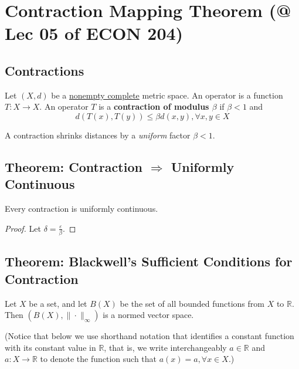 \documentclass[11pt]{elegantbook}
\begin{document}
\section{Contraction Mapping Theorem \small{(@ Lec 05 of ECON 204)}}
\subsection{Contractions}
\begin{definition}
    \normalfont
    Let $(X, d)$ be a \underline{nonempty complete} metric space. An operator is a function $T : X \rightarrow X$. An operator $T$ is a \textbf{contraction of modulus $\beta$} if $\beta < 1$ and $$d(T(x), T(y)) \leq \beta d(x, y), \forall x,y\in X$$
\end{definition}
A contraction shrinks distances by a \textit{uniform} factor $\beta < 1$.

\subsection{Theorem: Contraction $\Rightarrow$ Uniformly Continuous}
\begin{theorem}
    Every contraction is uniformly continuous.
\end{theorem}
\begin{proof}
    Let $\delta=\frac{\varepsilon}{\beta}$.
\end{proof}

\subsection{Theorem: Blackwell's Sufficient Conditions for Contraction}
Let $X$ be a set, and let $B(X)$ be the set of all bounded functions from $X$ to $\mathbb{R}$. Then $(B(X), \|\cdot\|_\infty)$ is a normed vector space.

(Notice that below we use shorthand notation that identifies a constant function with its constant value in $\mathbb{R}$, that is, we write interchangeably $a \in \mathbb{R}$ and $a : X \rightarrow \mathbb{R}$ to denote the function such that $a(x) = a, \forall x \in X$.)
\end{document}
